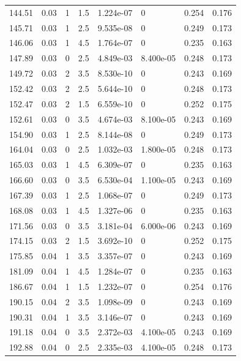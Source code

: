 \documentclass[preview]{standalone}
\begin{document}
{{{\begin{tabular}{L{1.2cm}C{1.2cm} C{0.3cm}C{0.5cm} C{1.4cm}C{1.4cm} C{1.4cm}C{1.4cm}}
  144.51  &  0.03  & 1     & 1.5 &  1.224e-07  & 0  & 0.254 &  0.176   \\ 
  145.71  &  0.03  & 1     & 2.5 &  9.535e-08  & 0  & 0.249 &  0.173   \\ 
  146.06  &  0.03  & 1     & 4.5 &  1.764e-07  & 0  & 0.235 &  0.163   \\ 
  147.89  &  0.03  & 0     & 2.5 &  4.849e-03  & 8.400e-05  & 0.248 &  0.173   \\ 
  149.72  &  0.03  & 2     & 3.5 &  8.530e-10  & 0  & 0.243 &  0.169   \\ 
  152.42  &  0.03  & 2     & 2.5 &  5.644e-10  & 0  & 0.248 &  0.173   \\ 
  152.47  &  0.03  & 2     & 1.5 &  6.559e-10  & 0  & 0.252 &  0.175   \\ 
  152.61  &  0.03  & 0     & 3.5 &  4.674e-03  & 8.100e-05  & 0.243 &  0.169   \\ 
  154.90  &  0.03  & 1     & 2.5 &  8.144e-08  & 0  & 0.249 &  0.173   \\ 
  164.04  &  0.03  & 0     & 2.5 &  1.032e-03  & 1.800e-05  & 0.248 &  0.173   \\ 
  165.03  &  0.03  & 1     & 4.5 &  6.309e-07  & 0  & 0.235 &  0.163   \\ 
  166.60  &  0.03  & 0     & 3.5 &  6.530e-04  & 1.100e-05  & 0.243 &  0.169   \\ 
  167.39  &  0.03  & 1     & 2.5 &  1.068e-07  & 0  & 0.249 &  0.173   \\ 
  168.08  &  0.03  & 1     & 4.5 &  1.327e-06  & 0  & 0.235 &  0.163   \\ 
  171.56  &  0.03  & 0     & 3.5 &  3.181e-04  & 6.000e-06  & 0.243 &  0.169   \\ 
  174.15  &  0.03  & 2     & 1.5 &  3.692e-10  & 0  & 0.252 &  0.175   \\ 
  175.85  &  0.04  & 1     & 3.5 &  3.357e-07  & 0  & 0.243 &  0.169   \\ 
  181.09  &  0.04  & 1     & 4.5 &  1.284e-07  & 0  & 0.235 &  0.163   \\ 
  186.67  &  0.04  & 1     & 1.5 &  1.232e-07  & 0  & 0.254 &  0.176   \\ 
  190.15  &  0.04  & 2     & 3.5 &  1.098e-09  & 0  & 0.243 &  0.169   \\ 
  190.31  &  0.04  & 1     & 3.5 &  3.146e-07  & 0  & 0.243 &  0.169   \\ 
  191.18  &  0.04  & 0     & 3.5 &  2.372e-03  & 4.100e-05  & 0.243 &  0.169   \\ 
  192.88  &  0.04  & 0     & 2.5 &  2.335e-03  & 4.100e-05  & 0.248 &  0.173   \\ 

\end{tabular}}}}
\end{document}
